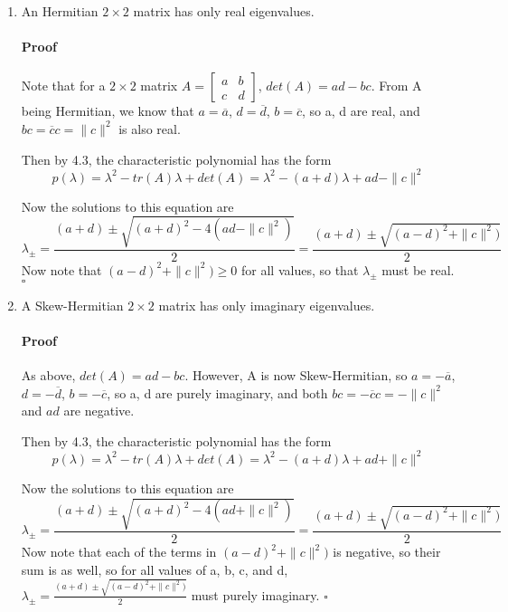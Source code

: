 \documentclass[letterpaper,12pt]{article}
\theoremstyle{definition}
\begin{document}
\begin{enumerate}[label=(\roman*)]
\item An Hermitian  $2 \times 2$ matrix has only real eigenvalues.

\paragraph{Proof} Note that for a $2 \times 2$ matrix $A =\begin{bmatrix}
a & b \\
c & d
\end{bmatrix}$, $det(A) = ad - bc$.
From A being Hermitian, we know that $a = \overline{a}$, $d = \overline{d}$, $b = \overline{c}$, so a, d are real, and $ bc = \overline{c}c = \|c\|^2$ is also real.

Then by 4.3, the characteristic polynomial has the form
$$p(\lambda) = \lambda^2 - tr(A)\lambda + det(A) = \lambda^2 - (a + d)\lambda + ad - \|c\|^2$$

Now the solutions to this equation are 
$$ \lambda_\pm =  \frac{(a + d) \pm \sqrt{(a + d)^2-4(ad -  \|c\|^2)}}{2} =  \frac{(a + d) \pm \sqrt{(a - d)^2 +  \|c\|^2)}}{2}  $$
Now note that $(a - d)^2 +  \|c\|^2) \ge 0$  for all values, so that  $ \lambda_\pm$ must be real. $\square$


\item A Skew-Hermitian  $2 \times 2$ matrix has only imaginary eigenvalues.

\paragraph{Proof} As above, $det(A) = ad - bc$. However, A is now Skew-Hermitian, so $a = - \overline{a}$, $d = -\overline{d}$, $b = -\overline{c}$, so a, d are purely imaginary, and both $ bc = -\overline{c}c = -\|c\|^2$ and $ad$ are negative.

Then by 4.3, the characteristic polynomial has the form
$$p(\lambda) = \lambda^2 - tr(A)\lambda + det(A) = \lambda^2 - (a + d)\lambda + ad + \|c\|^2$$

Now the solutions to this equation are 
$$ \lambda_\pm =  \frac{(a + d) \pm \sqrt{(a + d)^2-4(ad +  \|c\|^2)}}{2} =  \frac{(a + d) \pm \sqrt{(a - d)^2 +  \|c\|^2)}}{2}  $$
Now note that each of the terms in $(a - d)^2 +  \|c\|^2)$ is negative, so their sum is as well, so for all values of a, b, c, and d,  $ \lambda_\pm = \frac{(a + d) \pm \sqrt{(a - d)^2 +  \|c\|^2)}}{2} $ must purely imaginary. $\square$
\end{enumerate}
\end{document}
